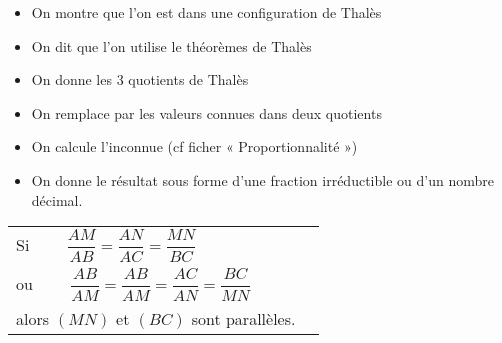 
\medskip 

    \renewcommand{\labelitemi}{\textbullet}
    
\begin{itemize}
\item On montre que l'on est dans une configuration de Thalès
\item On dit que l'on utilise le théorèmes de Thalès
\item On donne les 3 quotients de Thalès
\item On remplace par les valeurs connues dans deux quotients
\item On calcule l'inconnue (cf ficher « Proportionnalité ») 
\item On donne le résultat sous forme d'une fraction irréductible ou d'un nombre décimal.
\end{itemize}

\medskip   



\begin{tabular}{M{8cm}M{8cm}}
Si $\qquad\dfrac{AM}{AB} = \dfrac{AN}{AC} = \dfrac{MN}{BC}\qquad $ \\

\medskip

ou $\qquad\dfrac{AB}{AM} = \dfrac{AB}{AM} = \dfrac{AC}{AN} = \dfrac{BC}{MN}$\\

\medskip

alors $(MN)$ et $(BC)$ sont parallèles.
          &  
          
          \bigskip 
          
          \parbox{6cm}{
                     } \\
\end{tabular} 





\medskip

